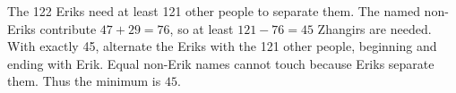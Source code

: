 The 122 Eriks need at least 121 other people to separate them. The named non-Eriks contribute $47+29=76$, so at least $121-76=45$ Zhangirs are needed. With exactly 45, alternate the Eriks with the 121 other people, beginning and ending with Erik. Equal non-Erik names cannot touch because Eriks separate them. Thus the minimum is $\boxed{45}$.
